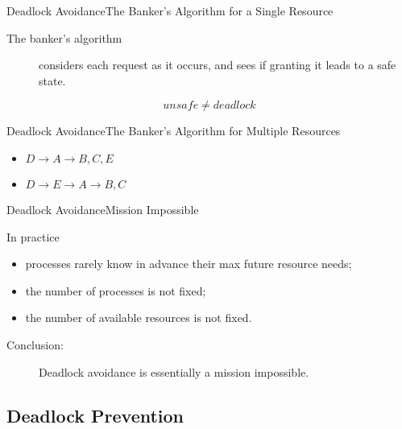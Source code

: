 \begin{frame}{Deadlock Avoidance}{The Banker's Algorithm for a Single Resource}
  \begin{description}
  \item[The banker's algorithm] considers each request as it occurs, and sees if granting
    it leads to a safe state.
  \end{description}
  \begin{center}
  \end{center}
  $$unsafe \neq deadlock$$
\end{frame}

\begin{frame}{Deadlock Avoidance}{The Banker's Algorithm for Multiple Resources}
  \begin{center}
  \end{center}
  \begin{itemize}
  \item[] $ D\rightarrow{}A\rightarrow{}B,C,E$
  \item[] $ D\rightarrow{}E\rightarrow{}A\rightarrow{}B,C$
  \end{itemize}
\end{frame}

\begin{frame}{Deadlock Avoidance}{Mission Impossible}
  \begin{block}{In practice}
    \begin{itemize}
    \item processes rarely know in advance their max future resource needs;
    \item the number of processes is not fixed;
    \item the number of available resources is not fixed.
    \end{itemize}
    \begin{description}
    \item[Conclusion:] Deadlock avoidance is essentially a mission impossible.
    \end{description}
  \end{block}
\end{frame}

\subsection{Deadlock Prevention}
\label{sec:deadlock-prevention}


